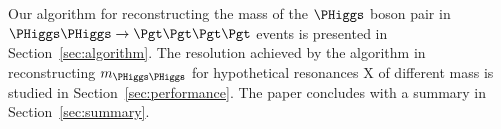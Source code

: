 Our algorithm for reconstructing the mass of the $\PHiggs$ boson pair 
in $\PHiggs\PHiggs \to \Pgt\Pgt\Pgt\Pgt$ events is presented in Section~\ref{sec:algorithm}.
The resolution achieved by the algorithm in reconstructing $m_{\PHiggs\PHiggs}$ 
for hypothetical resonances $\textrm{X}$ of different mass is studied in Section~\ref{sec:performance}.
The paper concludes with a summary in Section~\ref{sec:summary}.
